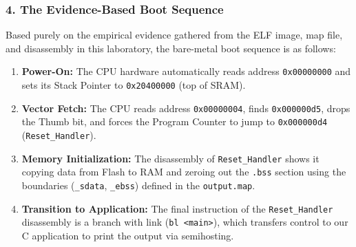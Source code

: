\subsubsection{4. The Evidence-Based Boot Sequence}
Based purely on the empirical evidence gathered from the ELF image, map file, and disassembly in this laboratory, the bare-metal boot sequence is as follows:
\begin{enumerate}
    \item \textbf{Power-On:} The CPU hardware automatically reads address \texttt{0x00000000} and sets its Stack Pointer to \texttt{0x20400000} (top of SRAM).
    \item \textbf{Vector Fetch:} The CPU reads address \texttt{0x00000004}, finds \texttt{0x000000d5}, drops the Thumb bit, and forces the Program Counter to jump to \texttt{0x000000d4} (\texttt{Reset\_Handler}).
    \item \textbf{Memory Initialization:} The disassembly of \texttt{Reset\_Handler} shows it copying data from Flash to RAM and zeroing out the \texttt{.bss} section using the boundaries (\texttt{\_sdata}, \texttt{\_ebss}) defined in the \texttt{output.map}.
    \item \textbf{Transition to Application:} The final instruction of the \texttt{Reset\_Handler} disassembly is a branch with link (\texttt{bl <main>}), which transfers control to our C application to print the output via semihosting.
\end{enumerate}













